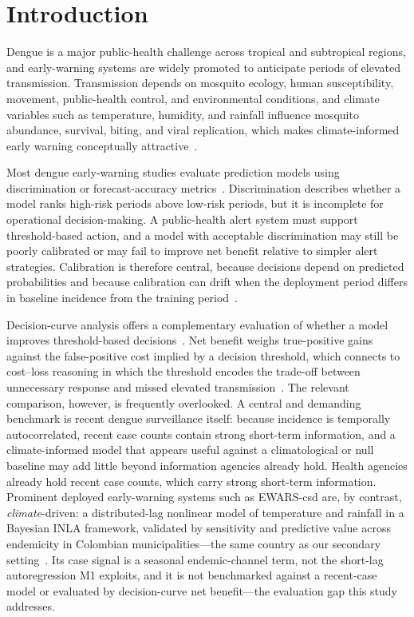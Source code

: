 \documentclass[11pt,a4paper]{article}
\begin{document}
\section{Introduction}

Dengue is a major public-health challenge across tropical and subtropical regions, and early-warning systems are widely promoted to anticipate periods of elevated transmission. Transmission depends on mosquito ecology, human susceptibility, movement, public-health control, and environmental conditions, and climate variables such as temperature, humidity, and rainfall influence mosquito abundance, survival, biting, and viral replication, which makes climate-informed early warning conceptually attractive~\cite{Mordecai2017,Huber2018}.

Most dengue early-warning studies evaluate prediction models using discrimination or forecast-accuracy metrics~\cite{Johansson2019,Baharom2022,HussainAlkhateeb2021,Lowe2021}. Discrimination describes whether a model ranks high-risk periods above low-risk periods, but it is incomplete for operational decision-making. A public-health alert system must support threshold-based action, and a model with acceptable discrimination may still be poorly calibrated or may fail to improve net benefit relative to simpler alert strategies. Calibration is therefore central, because decisions depend on predicted probabilities and because calibration can drift when the deployment period differs in baseline incidence from the training period~\cite{VanCalster2019,VanCalster2023,SteyerbergVergouwe2014}.

Decision-curve analysis offers a complementary evaluation of whether a model improves threshold-based decisions~\cite{Vickers2006,Vickers2016,Vickers2019}. Net benefit weighs true-positive gains against the false-positive cost implied by a decision threshold, which connects to cost--loss reasoning in which the threshold encodes the trade-off between unnecessary response and missed elevated transmission~\cite{Murphy1985,Tozan2023}. The relevant comparison, however, is frequently overlooked. A central and demanding benchmark is recent dengue surveillance itself: because incidence is temporally autocorrelated, recent case counts contain strong short-term information, and a climate-informed model that appears useful against a climatological or null baseline may add little beyond information agencies already hold. Health agencies already hold recent case counts, which carry strong short-term information. Prominent deployed early-warning systems such as EWARS-csd are, by contrast, \emph{climate}-driven: a distributed-lag nonlinear model of temperature and rainfall in a Bayesian INLA framework, validated by sensitivity and predictive value across endemicity in Colombian municipalities---the same country as our secondary setting~\cite{EWARScsd}. Its case signal is a seasonal endemic-channel term, not the short-lag autoregression M1 exploits, and it is not benchmarked against a recent-case model or evaluated by decision-curve net benefit---the evaluation gap this study addresses.
\end{document}
